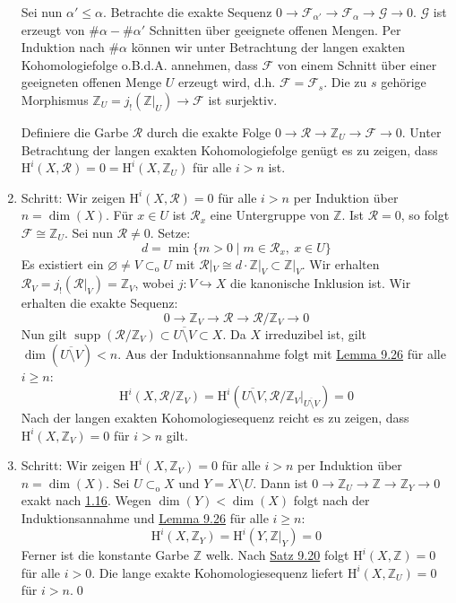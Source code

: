 \begin{enumerate}
Sei nun $\alpha'\leq\alpha$. Betrachte die exakte Sequenz $0\to\mathcal{F}_{\alpha'}\to\mathcal{F}_\alpha\to\mathcal{G}\to 0$. $\mathcal{G}$ ist erzeugt von $\#\alpha - \#\alpha'$ Schnitten über geeignete offenen Mengen. Per Induktion nach $\#\alpha$ können wir unter Betrachtung der langen exakten Kohomologiefolge o.B.d.A. annehmen, dass $\mathcal{F}$ von einem Schnitt über einer geeigneten offenen Menge $U$ erzeugt wird, d.h. $\mathcal{F}=\mathcal{F}_s$. Die zu $s$ gehörige Morphismus $\mathbb{Z}_U=j_!(\mathbb{Z}|_U)\to\mathcal{F}$ ist surjektiv.

Definiere die Garbe $\mathcal{R}$ durch die exakte Folge $0\to\mathcal{R}\to\mathbb{Z}_U\to\mathcal{F}\to 0$. Unter Betrachtung der langen exakten Kohomologiefolge genügt es zu zeigen, dass $\mathrm{H}^i(X,\mathcal{R})=0=\mathrm{H}^i(X,\mathbb{Z}_U)$ für alle $i>n$ ist.
\item Schritt: Wir zeigen $\mathrm{H}^i(X,\mathcal{R})=0$ für alle $i>n$ per Induktion über $n=\dim(X)$. Für $x\in U$ ist $\mathcal{R}_x$ eine Untergruppe von $\mathbb{Z}$. Ist $\mathcal{R} = 0$, so folgt $\mathcal{F}\cong\mathbb{Z}_U$. Sei nun $\mathcal{R}\neq 0$. Setze:
\[d=\min\{m>0\mid m\in\mathcal{R}_x,\ x\in U\} \]
Es existiert ein $\varnothing\neq V\subset_\text{o}U$ mit $\mathcal{R}|_V\cong d\cdot\mathbb{Z}|_V\subset \mathbb{Z}|_V$. Wir erhalten $\mathcal{R}_V=j_!(\mathcal{R}|_V)=\mathbb{Z}_V$, wobei $j:V\hookrightarrow X$ die kanonische Inklusion ist. Wir erhalten die exakte Sequenz:
\[0\longrightarrow\mathbb{Z}_V\longrightarrow\mathcal{R}\longrightarrow\mathcal{R}/\mathbb{Z}_V\longrightarrow 0 \]
Nun gilt $\operatorname{supp}(\mathcal{R}/\mathbb{Z}_V)\subset\overline{U\setminus V}\subset X$. Da $X$ irreduzibel ist, gilt $\dim(\overline{U\setminus V})<n$. Aus der Induktionsannahme folgt mit \hyperref[9.26]{Lemma 9.26} für alle $i\geq n$:
\[\mathrm{H}^i(X,\mathcal{R}/\mathbb{Z}_V) = \mathrm{H}^i(\overline{U\setminus V},\mathcal{R}/\mathbb{Z}_V|_{\overline{U\setminus V}})=0 \]
Nach der langen exakten Kohomologiesequenz reicht es zu zeigen, dass $\mathrm{H}^i(X,\mathbb{Z}_V)=0$ für $i>n$ gilt.
\item Schritt: Wir zeigen $\mathrm{H}^i(X,\mathbb{Z}_V)=0$ für alle $i>n$ per Induktion über $n=\dim(X)$. Sei $U\subset_\text{o}X$ und $Y=X\setminus U$. Dann ist $0\to\mathbb{Z}_U\to\mathbb{Z}\to\mathbb{Z}_Y\to 0$ exakt nach \hyperref[1.16]{1.16}. Wegen $\dim(Y)<\dim(X)$ folgt nach der Induktionsannahme und \hyperref[9.26]{Lemma 9.26} für alle $i\geq n$:
\[\mathrm{H}^i(X,\mathbb{Z}_Y)=\mathrm{H}^i(Y,\mathbb{Z}|_Y)=0 \]
Ferner ist die konstante Garbe $\mathbb{Z}$ welk. Nach \hyperref[9.20]{Satz 9.20} folgt $\mathrm{H}^i(X,\mathbb{Z})=0$ für alle $i>0$. Die lange exakte Kohomologiesequenz liefert $\mathrm{H}^i(X,\mathbb{Z}_U)=0$ für $i>n$.\qed
\end{enumerate}

